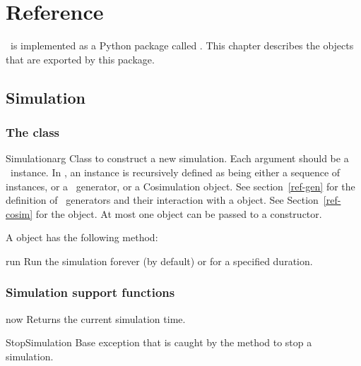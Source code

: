 \chapter{Reference \label{ref}}


\myhdl\ is implemented as a Python package called . This
chapter describes the objects that are exported by this package.

\section{Simulation \label{ref-sim}}

\subsection{The  class \label{ref-simclass}}

\begin{classdesc}{Simulation}{arg }
Class to construct a new simulation. Each argument should be a
\myhdl\ instance. In \myhdl{}, an instance is recursively defined
as being either a sequence of instances, or a \myhdl\ generator, or a
Cosimulation object. See section~\ref{ref-gen} for the definition of
\myhdl\ generators and their interaction with a
 object.  See Section~\ref{ref-cosim}
for the  object.  At most one 
object can be passed to a  constructor.

\end{classdesc}

A  object has the following method:

\begin{methoddesc}[Simulation]{run}{}
Run the simulation forever (by default) or for a specified duration.
\end{methoddesc}


\subsection{Simulation support functions\label{ref-simsupport}}

\begin{funcdesc}{now}{}
Returns the current simulation time.
\end{funcdesc}

\begin{excclassdesc}{StopSimulation}{}
Base exception that is caught by the  method to
stop a simulation.
\end{excclassdesc}


